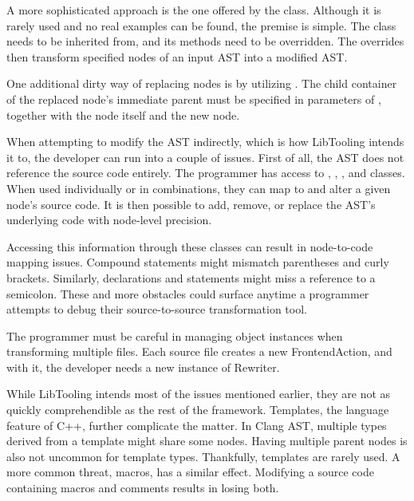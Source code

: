 A more sophisticated approach is the one offered 
by the  class. 
Although it is rarely used and no real examples can be found, 
the premise is simple. 
The  class needs to be inherited from, 
and its  methods need to be overridden. 
The overrides then transform specified nodes of an input AST 
into a modified AST.

One additional dirty way of replacing nodes is by utilizing 
. 
The child container of the replaced node's immediate parent must be 
specified in parameters of , together with 
the node itself and the new node.

When attempting to modify the AST indirectly, which is how LibTooling 
intends it to, the developer can run into a couple of issues. 
First of all, the AST does not reference the source code entirely. 
The programmer has access to , ,
, and  classes. 
When used individually or in combinations, they can map to and alter 
a given node's source code.
It is then possible to add, remove, or replace the AST's underlying 
code with node-level precision.

Accessing this information through these classes can result in 
node-to-code mapping issues. 
Compound statements might mismatch parentheses and curly brackets. 
Similarly, declarations and statements might miss a reference to 
a semicolon. 
These and more obstacles could surface anytime a programmer attempts 
to debug their source-to-source transformation tool. 

The programmer must be careful in managing object instances when 
transforming multiple files. 
Each source file creates a new FrontendAction, and with it, 
the developer needs a new instance of Rewriter.

While LibTooling intends most of the issues mentioned earlier, 
they are not as quickly comprehendible as the rest of the framework. 
Templates, the language feature of C++, further complicate the matter. 
In Clang AST, multiple types derived from a template might share some nodes. 
Having multiple parent nodes is also not uncommon for template types. 
Thankfully, templates are rarely used. 
A more common threat, macros, has a similar effect. 
Modifying a source code containing macros and comments results in 
losing both.

